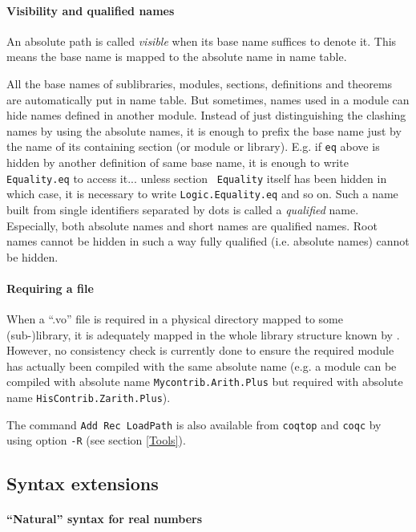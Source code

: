 \documentclass[11pt]{article}
\begin{document}
\paragraph{Visibility and qualified names}
An absolute path is called {\it visible} when its base name suffices
to denote it. This means the base name is mapped to the absolute name
in {\Coq} name table.

All the base names of sublibraries, modules, sections, definitions and
theorems are automatically put in {\Coq} name table. But sometimes,
names used in a module can hide names defined in another module.
Instead of just distinguishing the clashing names by using the
absolute names, it is enough to prefix the base name just by the name
of its containing section (or module or library). E.g. if {\tt eq}
above is hidden by another definition of same base name, it is enough
to write {\tt Equality.eq} to access it... unless section {\tt
Equality} itself has been hidden in which case, it is necessary to
write {\tt Logic.Equality.eq} and so on. Such a name built from
single identifiers separated by dots is called a {\it qualified}
name. Especially, both absolute names and short names are qualified
names. Root names cannot be hidden in such a way fully qualified
(i.e. absolute names) cannot be hidden.

\paragraph{Requiring a file}

When a ``.vo'' file is required in a physical directory mapped to some
(sub-)library, it is adequately mapped in the whole library structure
known by \Coq. However, no consistency check is currently done to
ensure the required module has actually been compiled with the same
absolute name (e.g. a module can be compiled with absolute name
{\tt Mycontrib.Arith.Plus} but required with absolute name
{\tt HisContrib.Zarith.Plus}).

The command {\tt Add Rec LoadPath} is also available from {\tt coqtop}
and {\tt coqc} by using option \verb=-R= (see section \ref{Tools}).

\subsection{Syntax extensions}
\label{SyntaxExtensions}

\paragraph{``Natural'' syntax for real numbers}
\end{document}
